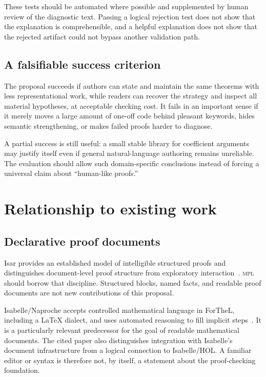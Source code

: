 \documentclass[11pt,a4paper]{article}
\newcommand{\MPL}{\textnormal{\textsc{mpl}}}
\theoremstyle{remark}
\begin{document}
These tests should be automated where possible and supplemented by human review of the diagnostic text. Passing a logical rejection test does not show that the explanation is comprehensible, and a helpful explanation does not show that the rejected artifact could not bypass another validation path.

\subsection{A falsifiable success criterion}

The proposal succeeds if authors can state and maintain the same theorems with less representational work, while readers can recover the strategy and inspect all material hypotheses, at acceptable checking cost. It fails in an important sense if it merely moves a large amount of one-off code behind pleasant keywords, hides semantic strengthening, or makes failed proofs harder to diagnose.

A partial success is still useful: a small stable library for coefficient arguments may justify itself even if general natural-language authoring remains unreliable. The evaluation should allow such domain-specific conclusions instead of forcing a universal claim about ``human-like proofs.''

\section{Relationship to existing work}
\label{sec:related}

\subsection{Declarative proof documents}

Isar provides an established model of intelligible structured proofs and distinguishes document-level proof structure from exploratory interaction~\cite{isar}. \MPL{} should borrow that discipline. Structured blocks, named facts, and readable proof documents are not new contributions of this proposal.

Isabelle/Naproche accepts controlled mathematical language in ForTheL, including a \LaTeX{} dialect, and uses automated reasoning to fill implicit steps~\cite{naproche}. It is a particularly relevant predecessor for the goal of readable mathematical documents. The cited paper also distinguishes integration with Isabelle's document infrastructure from a logical connection to Isabelle/HOL. A familiar editor or syntax is therefore not, by itself, a statement about the proof-checking foundation.
\end{document}
